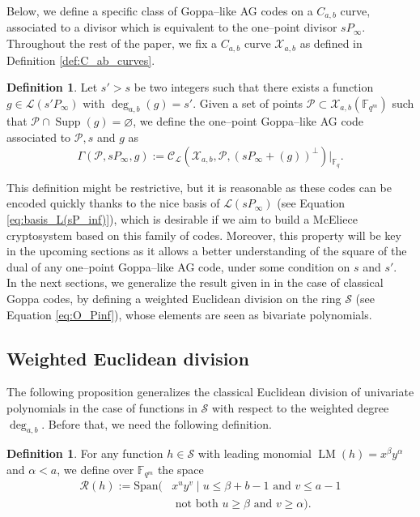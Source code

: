 \documentclass[journal]{IEEEtran}
\theoremstyle{plain}
\theoremstyle{definition}
\newtheorem{definition}[thm]{Definition}
\theoremstyle{remark}
\newcommand{\calP}{\mathcal{P}}
\newcommand{\calL}{\mathcal{L}}
\newcommand{\calC}{\mathcal{C}}
\newcommand{\calR}{\mathcal{R}}
\newcommand{\calS}{\mathcal{S}}
\newcommand{\calX}{\mathcal{X}}
\newcommand{\fqm}{\mathbb{F}_{q^m}}
\newcommand{\fq}{\mathbb{F}_{q}}
\newcommand{\F}{\mathbb{F}}
\newcommand{\LM}[1]{\operatorname{LM}\left(#1\right)}
\newcommand{\Supp}{\operatorname{Supp}}
\newcommand{\degab}[1]{\deg_{a,b}\left(#1\right)}
\begin{document}
	Below, we define a specific class of Goppa--like AG codes on a $C_{a,b}$ curve, associated to a divisor which is equivalent to the one--point divisor $sP_\infty$. 
	\noindent Throughout the rest of the paper, we fix a $C_{a,b}$ curve $\calX_{a,b}$ as defined in Definition \ref{def:C_ab_curves}.
	\begin{definition} \label{def:one--point_Goppa--like_AG_codes_on_C_a,b_curves}
		Let $s'>s$ be two integers such that there exists a function $g \in \calL(s'P_\infty)$ with $\degab{g}=s'$. Given a set of points  $\calP \subset \calX_{a,b}(\F_{q^m})$ such that $\calP \cap \Supp(g) = \varnothing$, we define the one--point Goppa--like AG code associated to $\calP,s$ and $g$ as 
		\[\Gamma(\calP,sP_\infty,g) := \calC_{\calL}(\calX_{a,b},\calP,(sP_\infty+(g))^{\perp})|_{\fq}.\]
	\end{definition}
	This definition might be restrictive, but it is reasonable as these codes can be encoded quickly thanks to the nice basis of $\calL(sP_\infty)$ (see Equation \eqref{eq:basis_L(sP_inf)}), which is desirable if we aim to build a McEliece cryptosystem based on this family of codes. Moreover, this property will be key in the upcoming sections as it allows a better understanding of the square of the dual of any one--point Goppa--like AG code, under some condition on $s$ and $s'$. \\
	
	\noindent In the next sections, we generalize the result given in \cite{MT21} in the case of classical Goppa codes, by defining a weighted Euclidean division on the ring $\calS$ (see Equation \eqref{eq:O_Pinf}), whose elements are seen as bivariate polynomials. 
	\subsection{Weighted Euclidean division}
	\noindent The following proposition generalizes the classical Euclidean division of univariate polynomials in the case of functions in $\calS$ with respect to the weighted degree $\deg_{a,b}$. Before that, we need the following definition.
	
	\begin{definition} \label{def:remainder_space}
		For any function $h \in \calS$ with leading monomial $\LM{h}=x^\beta y^\alpha$ and $\alpha < a$, we define over $\fqm$ the space
\[\begin{aligned}
		\calR(h) := \text{Span}(&x^u y^v \mid u \leq \beta + b-1 \text{ and } v\leq a-1\\& \text{ not both }  u \geq \beta \text{ and } v \geq \alpha).
\end{aligned}\]


	\end{definition}
	
\end{document}

